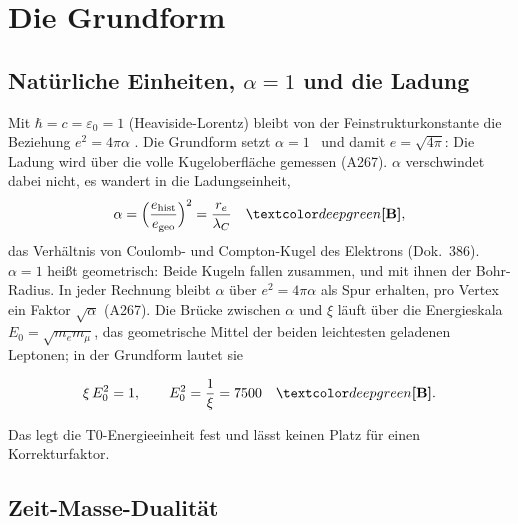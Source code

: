 \section{Die Grundform}

\subsection{Natürliche Einheiten, \texorpdfstring{$\alpha=1$}{alpha = 1} und die Ladung}

Mit $\hbar=c=\varepsilon_0=1$ (Heaviside-Lorentz) bleibt von der Feinstrukturkonstante die
Beziehung $e^2=4\pi\alpha$ \BM. Die Grundform setzt $\alpha=1$ \QM\ und damit
$e=\sqrt{4\pi}$: Die Ladung wird über die volle Kugeloberfläche gemessen (A267). $\alpha$
verschwindet dabei nicht, es wandert in die Ladungseinheit,
\begin{equation}
  \alpha=\Bigl(\frac{e_{\text{hist}}}{e_{\text{geo}}}\Bigr)^2=\frac{r_e}{\lambda_C}\quad\BM ,
\end{equation}
das Verhältnis von Coulomb- und Compton-Kugel des Elektrons (Dok.~386). $\alpha=1$ heißt
geometrisch: Beide Kugeln fallen zusammen, und mit ihnen der Bohr-Radius. In jeder Rechnung
bleibt $\alpha$ über $e^2=4\pi\alpha$ als Spur erhalten, pro Vertex ein Faktor $\sqrt\alpha$
(A267). Die Brücke zwischen $\alpha$ und $\xi$ läuft über die Energieskala
$E_0=\sqrt{m_em_\mu}$, das geometrische Mittel der beiden leichtesten geladenen Leptonen; in der
Grundform lautet sie
\begin{ffkern}
\begin{equation}
  \xi\,E_0^2=1,\qquad E_0^2=\frac1\xi=7500\quad\BM .
\end{equation}
\end{ffkern}%
Das legt die T0-Energieeinheit fest und lässt keinen Platz für einen Korrekturfaktor.

\subsection{Zeit-Masse-Dualität}

